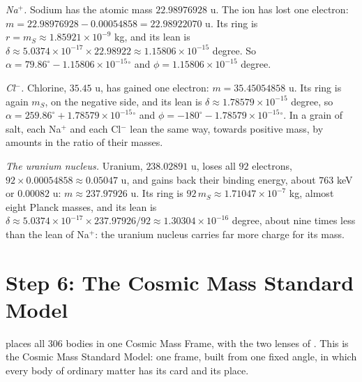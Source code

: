 \begin{workedexample}
\emph{Na$^+$.} Sodium has the atomic mass $22.98976928$ u. The ion has lost one electron: $m = 22.98976928 - 0.00054858 = 22.98922070$ u. Its ring is $r = m_S \approx 1.85921 \times 10^{-9}$ kg, and its lean is $\delta \approx 5.0374 \times 10^{-17} \times 22.98922 \approx 1.15806 \times 10^{-15}$ degree. So $\alpha = 79.86^\circ - 1.15806 \times 10^{-15}{}^\circ$ and $\phi = 1.15806 \times 10^{-15}$ degree.

\emph{Cl$^-$.} Chlorine, $35.45$ u, has gained one electron: $m = 35.45054858$ u. Its ring is again $m_S$, on the negative side, and its lean is $\delta \approx 1.78579 \times 10^{-15}$ degree, so $\alpha = 259.86^\circ + 1.78579 \times 10^{-15}{}^\circ$ and $\phi = -180^\circ - 1.78579 \times 10^{-15}{}^\circ$. In a grain of salt, each Na$^+$ and each Cl$^-$ lean the same way, towards positive mass, by amounts in the ratio of their masses.

\emph{The uranium nucleus.} Uranium, $238.02891$ u, loses all $92$ electrons, $92 \times 0.00054858 \approx 0.05047$ u, and gains back their binding energy, about $763$ keV or $0.00082$ u: $m \approx 237.97926$ u. Its ring is $92\,m_S \approx 1.71047 \times 10^{-7}$ kg, almost eight Planck masses, and its lean is $\delta \approx 5.0374 \times 10^{-17} \times 237.97926/92 \approx 1.30304 \times 10^{-16}$ degree, about nine times less than the lean of Na$^+$: the uranium nucleus carries far more charge for its mass.
\end{workedexample}

\section{Step 6: The Cosmic Mass Standard Model}\label{sec:sm-model}

 places all 306 bodies in one Cosmic Mass Frame, with the two lenses of . This is the Cosmic Mass Standard Model: one frame, built from one fixed angle, in which every body of ordinary matter has its card and its place.


